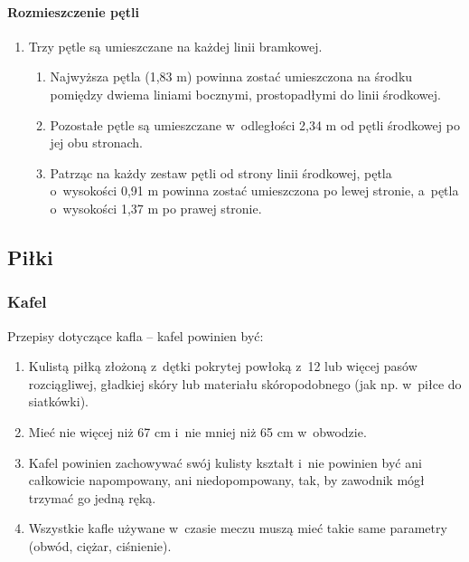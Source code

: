 \documentclass[12pt,a4paper]{article}
\begin{document}
\paragraph{Rozmieszczenie pętli}
\begin{enumerate}
	\item Trzy pętle są umieszczane na każdej linii bramkowej.
	      \begin{enumerate}
		      \item Najwyższa pętla (1,83 m) powinna zostać umieszczona na środku
		            pomiędzy dwiema liniami bocznymi, prostopadłymi do linii środkowej.

		      \item Pozostałe pętle są umieszczane w~odległości 2,34 m od pętli
		            środkowej po jej obu stronach.

		      \item Patrząc na każdy zestaw pętli od strony linii środkowej, pętla o~wysokości 0,91 m powinna zostać umieszczona po lewej stronie, a~pętla o~wysokości 1,37 m po prawej stronie.
	      \end{enumerate}
\end{enumerate}

\subsection{Piłki}

\subsubsection{Kafel}
Przepisy dotyczące kafla -- kafel powinien być:

\begin{enumerate}
	\item Kulistą piłką złożoną z~dętki pokrytej powłoką z~12 lub więcej pasów
	      rozciągliwej, gładkiej skóry lub materiału skóropodobnego (jak np. w~piłce do siatkówki).

	\item Mieć nie więcej niż 67 cm i~nie mniej niż 65 cm w~obwodzie.

	\item Kafel powinien zachowywać swój kulisty kształt i~nie powinien być ani
	      całkowicie napompowany, ani niedopompowany, tak, by zawodnik mógł
	      trzymać go jedną ręką.

	\item Wszystkie kafle używane w~czasie meczu muszą mieć takie same
	      parametry (obwód, ciężar, ciśnienie).
\end{enumerate}
\end{document}

